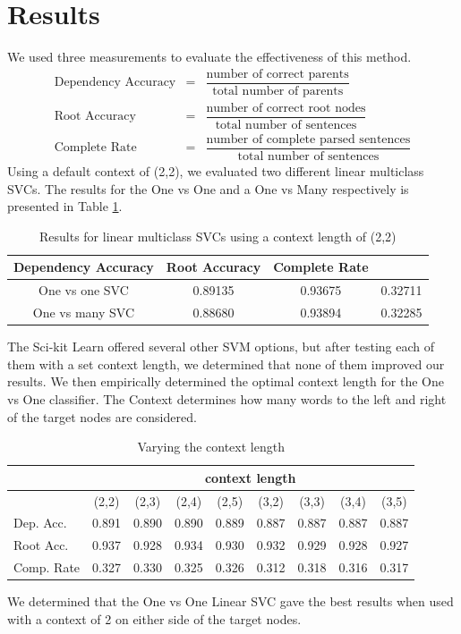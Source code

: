 \documentclass[12pt]{amsart}
\begin{document}
\section{Results}
We used three measurements to evaluate the effectiveness of this method.
\begin{eqnarray*}
    \text{Dependency Accuracy} &=& \dfrac{\text{number of correct parents}}{\text{total number of parents}}\\
    \text{Root Accuracy} &=& \dfrac{\text{number of correct root nodes}}{\text{total number of sentences}}\\
    \text{Complete Rate} &=& \dfrac{\text{number of complete parsed sentences}}{\text{total number of sentences}}
\end{eqnarray*}
Using a default context of (2,2), we evaluated two different linear multiclass SVCs. The results for the One vs One and a One vs Many respectively is presented in Table \ref{key_results}.
\begin{table}
\label{key_results}
\caption{Results for linear multiclass SVCs using a context length of (2,2)}
        \begin{tabular}{c|ccc}
            \hline \hline Dependency Accuracy & Root Accuracy & Complete Rate \\ \hline
            One vs one SVC & 0.89135 & 0.93675 & 0.32711 \\
            One vs many SVC & 0.88680 & 0.93894 & 0.32285 \\ \hline
        \end{tabular}
\end{table}
The Sci-kit Learn offered several other SVM options, but after testing each of them with a set context length, we determined
that none of them improved our results. We then empirically determined the optimal context length for the One vs One classifier. The Context determines how many words to the left and right of the target nodes are considered.
\begin{table}
\caption{Varying the context length}
\begin{tabular}{l|cccc|cccc}
  \hline \hline
&\multicolumn{8}{c}{context length} \\ \hline
             & (2,2) & (2,3) & (2,4) & (2,5) & (3,2) & (3,3) & (3,4) & (3,5) \\ \hline 
            Dep. Acc. & 0.891 & 0.890 & 0.890 & 0.889 & 0.887 & 0.887 & 0.887 & 0.887 \\
            Root Acc. & 0.937 & 0.928 & 0.934 & 0.930 & 0.932 & 0.929 & 0.928 & 0.927 \\
            Comp. Rate & 0.327 & 0.330 & 0.325 & 0.326 & 0.312 & 0.318 & 0.316 & 0.317 \\ \hline
\end{tabular}
\end{table}
We determined that the One vs One Linear SVC gave the best results when used with a context of 2 on either side of the target nodes. 
\end{document}
